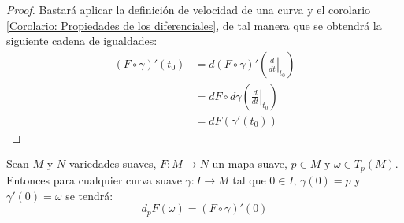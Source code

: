 \begin{proof}
	Bastará aplicar la definición de velocidad de una curva y el corolario \ref{Corolario: Propiedades de los diferenciales}, de tal manera que se obtendrá la siguiente cadena de igualdades:
	\begin{align*}
		(F \circ \gamma)'(t_0) & = d(F \circ \gamma)'
		\left(\left. \frac{d}{dt}\right|_{t_0} \right)                                              \\
		                       & = dF \circ d \gamma \left( \left. \frac{d}{dt}\right|_{t_0}\right) \\
		                       & = dF(\gamma'(t_0))
	\end{align*}
\end{proof}

\begin{corollary}
	Sean $M$ y $N$ variedades suaves, $F: M \to N$ un mapa suave, $p \in M$ y $\omega \in T_p(M)$. Entonces para cualquier curva suave $\gamma: I \to M$ tal que $0 \in I$, $\gamma(0) = p$ y $\gamma'(0) = \omega$ se tendrá:
	\[
		d_pF(\omega) = (F \circ \gamma)'(0)
	\]
\end{corollary}
